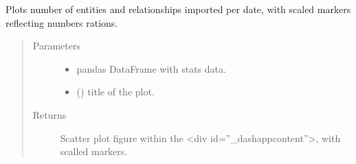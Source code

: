 \documentclass[letterpaper,10pt,english]{sphinxmanual}
\begin{document}

\begin{fulllineitems}
\label{\detokenize{_autosummary/report_manager.apps:report_manager.apps.imports.plot_total_numbers_per_date}}
Plots number of entities and relationships imported per date, with scaled markers reflecting numbers rations.
\begin{quote}\begin{description}
\item[{Parameters}] \leavevmode\begin{itemize}
\item {} 
 \textendash{} pandas DataFrame with stats data.

\item {} 
 () \textendash{} title of the plot.

\end{itemize}

\item[{Returns}] \leavevmode
Scatter plot figure within the \textless{}div id=”\_dash\sphinxhyphen{}app\sphinxhyphen{}content”\textgreater{}, with scalled markers.

\end{description}\end{quote}

\end{fulllineitems}

\end{document}
